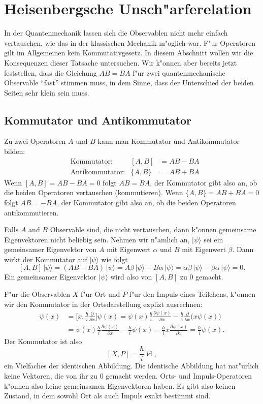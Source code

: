 \chapter{Heisenbergsche Unsch"arferelation\label{chapter:heisenberg}}
\rhead{}

In der Quantenmechanik lassen sich die Observablen nicht mehr einfach
vertauschen, wie das in der klassischen Mechanik m"oglich war.
F"ur Operatoren gilt im Allgemeinen kein Kommutativgesetz.
In diesem Abschnitt wollen wir die Konsequenzen dieser Tatsache
untersuchen.
Wir k"onnen aber bereits jetzt feststellen, dass die Gleichung
$AB=BA$ f"ur zwei quantenmechanische Observable ``fast'' stimmen
muss, in dem Sinne, dass der Unterschied der beiden Seiten sehr
klein sein muss. 

\section{Kommutator und Antikommutator}
Zu zwei Operatoren $A$ und $B$ kann man Kommutator und Antikommutator
bilden:
\[
\begin{aligned}
&\text{Kommutator:}&
[A,B]&=AB-BA
\\
&\text{Antikommutator:}&
\{A,B\}&=AB+BA
\end{aligned}
\]
Wenn $[A,B]=AB-BA=0$ folgt $AB=BA$,
der Kommutator gibt also an, ob die beiden Operatoren vertauschen (kommutieren).
Wenn $\{A,B\}=AB+BA=0$ folgt $AB=-BA$,
der Kommutator gibt also an, ob die beiden Operatoren antikommutieren.

Falls $A$ and $B$ Observable sind, die nicht vertauschen, dann k"onnen
gemeinsame Eigenvektoren nicht beliebig sein.
Nehmen wir n"amlich an, $|\psi\rangle$ sei ein gemeinsamer Eigenvektor
von $A$ mit Eigenwert $\alpha$ und $B$ mit Eigenwert $\beta$.
Dann wirkt der Kommutator auf $|\psi\rangle$ wie folgt
\[
[A,B]\,|\psi\rangle
=
(AB-BA)\,|\psi\rangle 
=
A\beta\,|\psi\rangle -B\alpha\,|\psi\rangle
=
\alpha\beta\,|\psi\rangle-\beta\alpha\,|\psi\rangle
=
0.
\]
Ein gemeinsamer Eigenvektor $|\psi\rangle$ wird also von $[A,B]$
zu $0$ gemacht.

F"ur die Observablen $X$ f"ur Ort und $P$ f"ur den Impuls eines Teilchens,
k"onnen wir den Kommutator in der Ortsdarstellung explizt ausrechnen:
\begin{align*}
[X,P]\psi(x)
&=
\biggl[
x,\frac{\hbar}{i}\frac{\partial}{\partial x}
\biggr]\psi(x)
=
\psi(x)\frac{\hbar}{i}\frac{\partial\psi(x)}{\partial x}
-
\frac{\hbar}{i}\frac{\partial}{\partial x}\bigl(x\psi(x)\bigr)
\\
&=
\psi(x)\frac{\hbar}{i}\frac{\partial\psi(x)}{\partial x}
-
\frac{\hbar}{i}\psi(x)
-
\frac{\hbar}{i}x\frac{\partial\psi(x)}{\partial x}
=
\frac{\hbar}{i}\psi(x).
\end{align*}
Der Kommutator ist also
\[
[X,P]=\frac{\hbar}{i}\operatorname{id},
\]
ein Vielfaches der identischen Abbildung.
Die identische Abbildung hat nat"urlich keine Vektoren, die von ihr
zu $0$ gemacht werden.
Orts- und Impuls-Operatoren k"onnen also keine gemeinsamen Eigenvektoren
haben.
Es gibt also keinen Zustand, in dem sowohl Ort als auch Impuls exakt
bestimmt sind.

